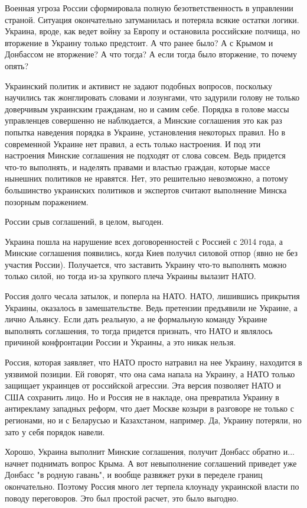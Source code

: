 Военная угроза России сформировала полную безответственность в управлении
страной. Ситуация окончательно затуманилась и потеряла всякие остатки логики.
Украина, вроде, как ведет войну за Европу и остановила российские полчища, но
вторжение в Украину только предстоит. А что ранее было? А с Крымом и Донбассом
не вторжение? А что тогда? А если тогда было вторжение, то почему опять? 

Украинский политик и активист не задают подобных вопросов, поскольку научились
так жонглировать словами и лозунгами, что задурили голову не только доверчивым
украинским гражданам, но и самим себе. Порядка в голове массы управленцев
совершенно не наблюдается, а Минские соглашения это как раз попытка наведения
порядка в Украине, установления некоторых правил. Но в современной Украине нет
правил, а есть только настроения. И под эти настроения Минские соглашения не
подходят от слова совсем. Ведь придется что-то выполнять, и наделять правами и
властью граждан, которые массе нынешних политиков не нравятся. Нет, это
решительно невозможно, а потому большинство украинских политиков и экспертов
считают выполнение Минска позорным поражением. 

России срыв соглашений, в целом, выгоден. 

Украина пошла на нарушение всех договоренностей с Россией с 2014 года, а
Минские соглашения появились, когда Киев получил силовой отпор (явно не без
участия России). Получается, что заставить Украину что-то выполнять можно
только силой, но тогда из-за хрупкого плеча Украины вылазит НАТО. 

Россия долго чесала затылок, и поперла на НАТО. НАТО, лишившись прикрытия
Украины, оказалось в замешательстве. Ведь претензии предъявили не Украине, а
лично Альянсу. Если дать реальную, а не формальную команду Украине выполнять
соглашения, то тогда придется признать, что НАТО и являлось причиной
конфронтации России и Украины, а это никак нельзя. 

Россия, которая заявляет, что НАТО просто натравил на нее Украину, находится в
уязвимой позиции. Ей говорят, что она сама напала на Украину, а НАТО только
защищает украинцев от российской агрессии. Эта версия позволяет НАТО и США
сохранить лицо. Но и Россия не в накладе, она превратила Украину в антирекламу
западных реформ, что дает Москве козыри в разговоре не только с регионами, но и
с Беларусью и Казахстаном, например. Да, Украину потеряли, но зато у себя
порядок навели. 

Хорошо, Украина выполнит Минские соглашения, получит Донбасс обратно и...
начнет поднимать вопрос Крыма. А вот невыполнение соглашений приведет уже
Донбасс "в родную гавань", и вообще развяжет руки в переделе границ
окончательно.  Поэтому Россия много лет терпела клоунаду украинской власти по
поводу переговоров. Это был простой расчет, это было выгодно. 

